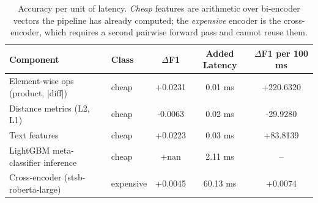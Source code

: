 \begin{table}[htbp]
\centering
\caption{Accuracy per unit of latency. \emph{Cheap} features are arithmetic over bi-encoder vectors the pipeline has already computed; the \emph{expensive} encoder is the cross-encoder, which requires a second pairwise forward pass and cannot reuse them.}
\label{tab:cheap_vs_expensive}
\begin{tabular}{llccc}
\toprule
\textbf{Component} & \textbf{Class} & \textbf{$\Delta$F1} & \textbf{Added Latency} & \textbf{$\Delta$F1 per 100 ms} \\
\midrule
Element-wise ops (product, |diff|) & cheap & +0.0231 & 0.01 ms & +220.6320 \\
Distance metrics (L2, L1) & cheap & -0.0063 & 0.02 ms & -29.9280 \\
Text features & cheap & +0.0223 & 0.03 ms & +83.8139 \\
LightGBM meta-classifier inference & cheap & +nan & 2.11 ms & -- \\
Cross-encoder (stsb-roberta-large) & expensive & +0.0045 & 60.13 ms & +0.0074 \\
\bottomrule
\end{tabular}
\end{table}
